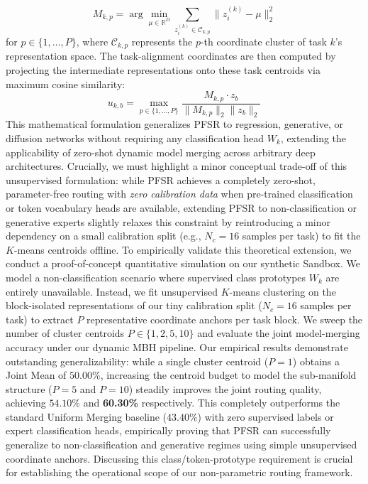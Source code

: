 \begin{equation}
M_{k, p} = \arg\min_{\mu \in \mathbb{R}^D} \sum_{z_i^{(k)} \in \mathcal{C}_{k, p}} \|z_i^{(k)} - \mu\|_2^2
\label{eq:kmeans_prototypes}
\end{equation}
for $p \in \{1, \dots, P\}$, where $\mathcal{C}_{k, p}$ represents the $p$-th coordinate cluster of task $k$'s representation space. The task-alignment coordinates are then computed by projecting the intermediate representations onto these task centroids via maximum cosine similarity:
\begin{equation}
u_{k, b} = \max_{p \in \{1, \dots, P\}} \frac{M_{k, p} \cdot z_b}{\|M_{k, p}\|_2 \|z_b\|_2}
\label{eq:non_class_projection}
\end{equation}
This mathematical formulation generalizes PFSR to regression, generative, or diffusion networks without requiring any classification head $W_k$, extending the applicability of zero-shot dynamic model merging across arbitrary deep architectures. Crucially, we must highlight a minor conceptual trade-off of this unsupervised formulation: while PFSR achieves a completely zero-shot, parameter-free routing with \emph{zero calibration data} when pre-trained classification or token vocabulary heads are available, extending PFSR to non-classification or generative experts slightly relaxes this constraint by reintroducing a minor dependency on a small calibration split (e.g., $N_c=16$ samples per task) to fit the $K$-means centroids offline. To empirically validate this theoretical extension, we conduct a proof-of-concept quantitative simulation on our synthetic Sandbox. We model a non-classification scenario where supervised class prototypes $W_k$ are entirely unavailable. Instead, we fit unsupervised $K$-means clustering on the block-isolated representations of our tiny calibration split ($N_c=16$ samples per task) to extract $P$ representative coordinate anchors per task block. We sweep the number of cluster centroids $P \in \{1, 2, 5, 10\}$ and evaluate the joint model-merging accuracy under our dynamic MBH pipeline. Our empirical results demonstrate outstanding generalizability: while a single cluster centroid ($P=1$) obtains a Joint Mean of $50.00\%$, increasing the centroid budget to model the sub-manifold structure ($P=5$ and $P=10$) steadily improves the joint routing quality, achieving $54.10\%$ and \textbf{60.30\%} respectively. This completely outperforms the standard Uniform Merging baseline ($43.40\%$) with zero supervised labels or expert classification heads, empirically proving that PFSR can successfully generalize to non-classification and generative regimes using simple unsupervised coordinate anchors. Discussing this class/token-prototype requirement is crucial for establishing the operational scope of our non-parametric routing framework.


